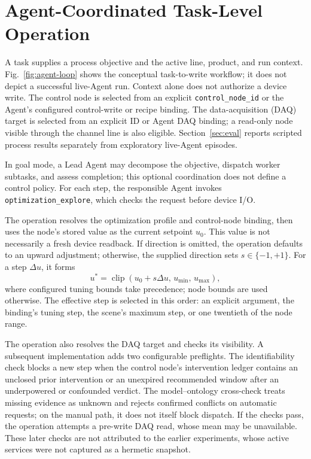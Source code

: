\section{Agent-Coordinated Task-Level Operation}
\label{sec:closed-loop-operation}

A task supplies a process objective and the active line, product, and run context. Fig.~\ref{fig:agent-loop} shows the conceptual task-to-write workflow; it does not depict a successful live-Agent run. Context alone does not authorize a device write. The control node is selected from an explicit \texttt{control\_node\_id} or the Agent's configured control-write or recipe binding. The data-acquisition (DAQ) target is selected from an explicit ID or Agent DAQ binding; a read-only node visible through the channel line is also eligible. Section~\ref{sec:eval} reports scripted process results separately from exploratory live-Agent episodes.

In goal mode, a Lead Agent may decompose the objective, dispatch worker subtasks, and assess completion; this optional coordination does not define a control policy. For each step, the responsible Agent invokes \texttt{optimization\_explore}, which checks the request before device I/O.

The operation resolves the optimization profile and control-node binding, then uses the node's stored value as the current setpoint $u_0$. This value is not necessarily a fresh device readback. If direction is omitted, the operation defaults to an upward adjustment; otherwise, the supplied direction sets $s\in\{-1,+1\}$. For a step $\Delta u$, it forms
\begin{equation}
 u^{*}=\operatorname{clip}\!\left(u_0+s\Delta u,\,u_{\min},\,u_{\max}\right),
 \label{eq:optimization-candidate}
\end{equation}
where configured tuning bounds take precedence; node bounds are used otherwise. The effective step is selected in this order: an explicit argument, the binding's tuning step, the scene's maximum step, or one twentieth of the node range.

The operation also resolves the DAQ target and checks its visibility. A subsequent implementation adds two configurable preflights. The identifiability check blocks a new step when the control node's intervention ledger contains an unclosed prior intervention or an unexpired recommended window after an underpowered or confounded verdict. The model--ontology cross-check treats missing evidence as unknown and rejects confirmed conflicts on automatic requests; on the manual path, it does not itself block dispatch. If the checks pass, the operation attempts a pre-write DAQ read, whose mean may be unavailable. These later checks are not attributed to the earlier experiments, whose active services were not captured as a hermetic snapshot.

